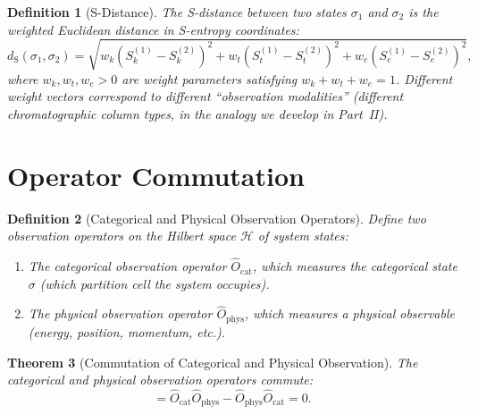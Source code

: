 \documentclass[11pt,twocolumn,a4paper]{article}
\newtheorem{theorem}{Theorem}[section]
\newtheorem{definition}[theorem]{Definition}
\newcommand{\Ocat}{\hat{O}_{\mathrm{cat}}}
\newcommand{\Ophys}{\hat{O}_{\mathrm{phys}}}
\newcommand{\Sk}{S_k}
\newcommand{\St}{S_t}
\newcommand{\Se}{S_e}
\newcommand{\Hilb}{\mathcal{H}}
\newcommand{\dS}{d_{\mathrm{S}}}
\begin{document}
\begin{definition}[S-Distance]
\label{def:s-distance}
The S-distance between two states $\sigma_1$ and $\sigma_2$ is the
weighted Euclidean distance in S-entropy coordinates:
\begin{equation}
\dS(\sigma_1, \sigma_2) = \sqrt{w_k(\Sk^{(1)} - \Sk^{(2)})^2 +
  w_t(\St^{(1)} - \St^{(2)})^2 + w_e(\Se^{(1)} - \Se^{(2)})^2},
\label{eq:s-distance}
\end{equation}
where $w_k, w_t, w_e > 0$ are weight parameters satisfying $w_k + w_t
+ w_e = 1$. Different weight vectors correspond to different
``observation modalities'' (different chromatographic column types, in
the analogy we develop in Part~II).
\end{definition}


\section{Operator Commutation}
\label{sec:commutation}

\begin{definition}[Categorical and Physical Observation Operators]
\label{def:operators}
Define two observation operators on the Hilbert space $\Hilb$ of
system states:
\begin{enumerate}[label=(\roman*),leftmargin=*]
\item The \emph{categorical observation operator} $\Ocat$, which
  measures the categorical state $\sigma$ (which partition cell the
  system occupies).
\item The \emph{physical observation operator} $\Ophys$, which
  measures a physical observable (energy, position, momentum, etc.).
\end{enumerate}
\end{definition}

\begin{theorem}[Commutation of Categorical and Physical Observation]
\label{thm:commutation}
The categorical and physical observation operators commute:
\begin{equation}
[\Ocat, \Ophys] = \Ocat \Ophys - \Ophys \Ocat = 0.
\label{eq:commutation}
\end{equation}
\end{theorem}
\end{document}
